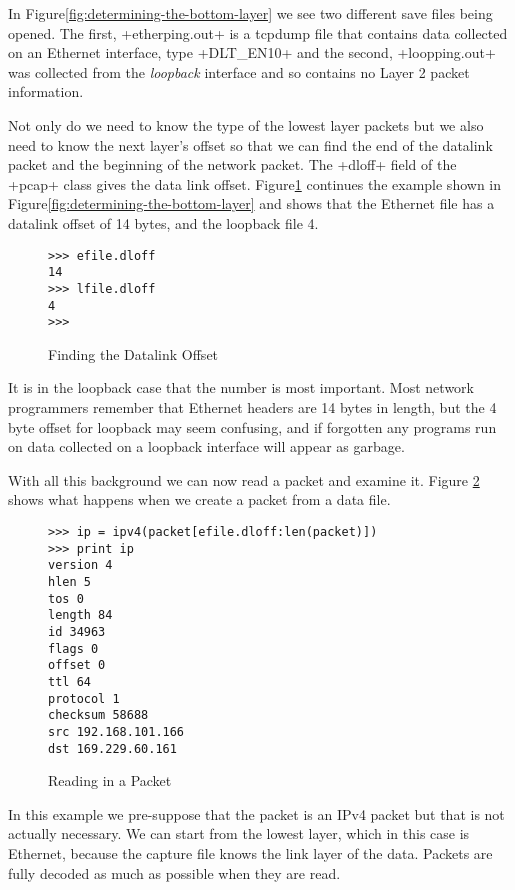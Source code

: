\documentclass[11pt]{article}
\begin{document}
In Figure\ref{fig:determining-the-bottom-layer} we see two different
save files being opened.  The first, \file+etherping.out+ is a tcpdump
file that contains data collected on an Ethernet interface, type
\constant+DLT\_EN10+ and the second, \file+loopping.out+ was collected
from the \emph{loopback} interface and so contains no Layer 2 packet
information.  

Not only do we need to know the type of the lowest layer packets but
we also need to know the next layer's offset so that we can find the
end of the datalink packet and the beginning of the network packet.
The \field+dloff+ field of the \class+pcap+ class gives the data link
offset.  Figure\ref{fig:finding-the-datalink-offset} continues the
example shown in Figure\ref{fig:determining-the-bottom-layer} and
shows that the Ethernet file has a datalink offset of 14 bytes, and
the loopback file 4. 

  \begin{figure}
    \centering
\begin{lstlisting}
>>> efile.dloff
14
>>> lfile.dloff
4
>>> 
\end{lstlisting}
    \caption{Finding the Datalink Offset}
    \label{fig:finding-the-datalink-offset}
  \end{figure}

It is in the loopback case that the number is most important.  Most
network programmers remember that Ethernet headers are 14 bytes in
length, but the 4 byte offset for loopback may seem confusing, and if
forgotten any programs run on data collected on a loopback interface
will appear as garbage.

With all this background we can now read a packet and examine it.
Figure \ref{fig:reading-in-a-packet} shows what happens when we create
a packet from a data file.  

\begin{figure}
  \centering
\begin{lstlisting}
>>> ip = ipv4(packet[efile.dloff:len(packet)])
>>> print ip
version 4
hlen 5
tos 0
length 84
id 34963
flags 0
offset 0
ttl 64
protocol 1
checksum 58688
src 192.168.101.166
dst 169.229.60.161
\end{lstlisting}
  \caption{Reading in a Packet}
  \label{fig:reading-in-a-packet}
\end{figure}

In this example we pre-suppose that the packet is an IPv4 packet but
that is not actually necessary.  We can start from the lowest layer,
which in this case is Ethernet, because the capture file knows the
link layer of the data.  Packets are fully decoded as much as possible
when they are read.  
\end{document}
